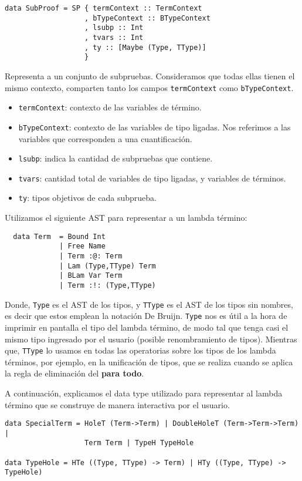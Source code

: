 \documentclass[a4paper,11pt]{article}
\begin{document}
\begin{verbatim}
data SubProof = SP { termContext :: TermContext
                   , bTypeContext :: BTypeContext
                   , lsubp :: Int
                   , tvars :: Int
                   , ty :: [Maybe (Type, TType)]
                   }
\end{verbatim}

Representa a un conjunto de subpruebas.
Consideramos que todas ellas tienen el mismo contexto, comparten tanto los campos \texttt{termContext} como \texttt{bTypeContext}.
\begin{itemize}
  \item \texttt{termContext}: contexto de las variables de término.
  \item \texttt{bTypeContext}: contexto de las variables de tipo ligadas. Nos referimos a las variables que corresponden a una cuantificación.
  \item \texttt{lsubp}: indica la cantidad de subpruebas que contiene.
  \item \texttt{tvars}: cantidad total de variables de tipo ligadas, y variables de términos.
  \item \texttt{ty}: tipos objetivos de cada subprueba.
\end{itemize}


Utilizamos el siguiente AST para representar a un lambda término:
\begin{verbatim}
  data Term  = Bound Int
             | Free Name 
             | Term :@: Term
             | Lam (Type,TType) Term
             | BLam Var Term
             | Term :!: (Type,TType)
\end{verbatim}
  
Donde, \texttt{Type} es el AST de los tipos, y \texttt{TType} es el AST de los tipos sin nombres, es decir que estos emplean la notación De Bruijn.
\texttt{Type} nos es útil a la hora de imprimir en pantalla el tipo del lambda término, de modo tal que tenga casi el mismo tipo ingresado por el usuario 
(posible renombramiento de tipos).
Mientras que, \texttt{TType} lo usamos en todas las operatorias sobre los tipos de los lambda términos, por ejemplo, en la unificación de tipos, que
se realiza cuando se aplica la regla de eliminación del \textbf{para todo}.

A continuación, explicamos el data type utilizado para representar al lambda término que se construye de manera interactiva por el usuario.

\begin{verbatim}
data SpecialTerm = HoleT (Term->Term) | DoubleHoleT (Term->Term->Term) |
                   Term Term | TypeH TypeHole

data TypeHole = HTe ((Type, TType) -> Term) | HTy ((Type, TType) -> TypeHole)
\end{verbatim}
\end{document}
